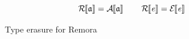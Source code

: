 {\begin{figure}
\begin{align*}
    \end{align*}
    \[
    \EraseTrm{\atom} = \EraseA{\atom} \qquad
    \EraseTrm{\expr} = \EraseE{\expr}
    \]
    \caption{Type erasure for Remora}
    \label{fig:ErasureDefn}
  \end{figure}
}

